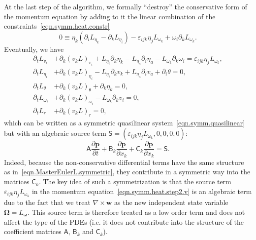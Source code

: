 \documentclass[twoside]{article}
\newcommand{\ww}{{\boldsymbol{w}}}
\newcommand{\pp}{{\boldsymbol{p}}}
\newcommand{\pd}{\partial}
\begin{document}
At the last step of the algorithm, we formally ``destroy'' the conservative 
form of the momentum equation by adding to it the linear combination of the 
constraints~\eqref{eqn.symm.heat.constr}
\begin{equation}
0\equiv \eta_k (\pd_i L_{\eta_k} - \pd_k L_{\eta_i}) - \varepsilon_{ijk} 
\eta_j L_{\omega_k} + \omega_i\pd_k L_{\omega_k}.
\end{equation}
Eventually, we have
\begin{subequations}\label{eqn.symm.heat.step2}
	\begin{align}
\pd _tL_{v_i} & + \pd _k\left(v_kL\right)_{v_i}+L_{\eta _i}\pd _k\eta 
_k-L_{\eta 
_a}\pd _i\eta _a-L_{\omega _k}\pd _k\omega
_i=\varepsilon _{i j k}\eta _jL_{\omega _k},\label{eqn.symm.heat.step2.v}\\[1mm]
\pd _tL_{\eta_i} & + \pd _k\left(v_kL\right)_{\eta _i}-L_{\eta _i}\pd 
_kv_k+L_{\eta _a}\pd _iv_a+\pd _i\theta =0,\\[1mm]
\pd _tL_{\theta } & + \pd _k\left(v_kL\right)_{\theta }+\pd_k\eta_k=0,\\[1mm]
\pd _tL_{\omega _i} & + \pd_k\left(v_k L\right)_{\omega _i} - L_{\omega_k}\pd_k 
v_i=0,\\[1mm]
\pd _tL_r & + \pd _k \left(v_kL\right)_r=0,
	\end{align}
\end{subequations}
which can be written as a symmetric quasilinear 
system~\eqref{eqn.symm.quasilinear} but with an algebraic source term $ 
\mathsf{S} = (\varepsilon _{i j k}\eta _jL_{\omega _k},0,0,0,0)$:
\begin{equation*}
\mathsf{A}\frac{\pd \pp}{\pd t} + \mathsf{B}_k \frac{\pd \pp}{\pd x_k} + 
\mathsf{C}_k\frac{\pd \pp}{\pd x_k} = \mathsf{S}.
\end{equation*}
Indeed, because the non-conservative differential terms have the 
same structure as in~\eqref{eqn.MasterEulerL.symmetric}, they
contribute in a symmetric way into the matrices $ \mathsf{C}_k $. The key idea 
of such a symmetrization is that the source 
term $ \varepsilon _{i j k}\eta _jL_{\omega _k} $ in the momentum 
equation~\eqref{eqn.symm.heat.step2.v} is an algebraic 
term due to the fact that we 
treat $ \nabla\times\ww $ as the new independent state variable $ 
\bm{\Omega} = L_{\bm{\omega}} $. This 
source term is therefore treated as a low order term and does not affect the 
type of the PDEs (i.e. it does not contribute into the structure of the 
coefficient matrices $ \mathsf{A} $, $ \mathsf{B}_k $ and $ \mathsf{C}_k $). 
\end{document}
